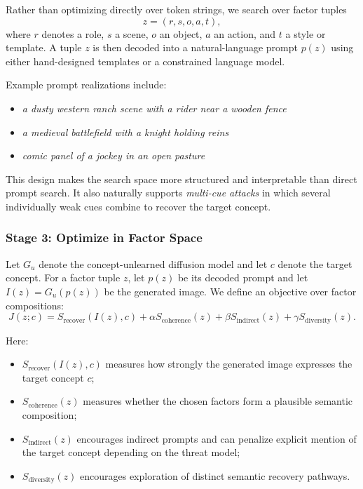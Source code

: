 Rather than optimizing directly over token strings, we search over factor tuples
\[
z = (r, s, o, a, t),
\]
where $r$ denotes a role, $s$ a scene, $o$ an object, $a$ an action, and $t$ a style or template. A tuple $z$ is then decoded into a natural-language prompt $p(z)$ using either hand-designed templates or a constrained language model.

Example prompt realizations include:
\begin{itemize}
    \item \emph{a dusty western ranch scene with a rider near a wooden fence}
    \item \emph{a medieval battlefield with a knight holding reins}
    \item \emph{comic panel of a jockey in an open pasture}
\end{itemize}

This design makes the search space more structured and interpretable than direct prompt search. It also naturally supports \emph{multi-cue attacks} in which several individually weak cues combine to recover the target concept.

\subsubsection{Stage 3: Optimize in Factor Space}
\label{subsubsec:stage3_optimization}

Let $G_u$ denote the concept-unlearned diffusion model and let $c$ denote the target concept. For a factor tuple $z$, let $p(z)$ be its decoded prompt and let $I(z) = G_u(p(z))$ be the generated image. We define an objective over factor compositions:
\begin{equation}
J(z;c)
=
S_{\mathrm{recover}}(I(z), c)
+
\alpha S_{\mathrm{coherence}}(z)
+
\beta S_{\mathrm{indirect}}(z)
+
\gamma S_{\mathrm{diversity}}(z).
\label{eq:graph_guided_objective}
\end{equation}

Here:
\begin{itemize}
    \item $S_{\mathrm{recover}}(I(z), c)$ measures how strongly the generated image expresses the target concept $c$;
    \item $S_{\mathrm{coherence}}(z)$ measures whether the chosen factors form a plausible semantic composition;
    \item $S_{\mathrm{indirect}}(z)$ encourages indirect prompts and can penalize explicit mention of the target concept depending on the threat model;
    \item $S_{\mathrm{diversity}}(z)$ encourages exploration of distinct semantic recovery pathways.
\end{itemize}

